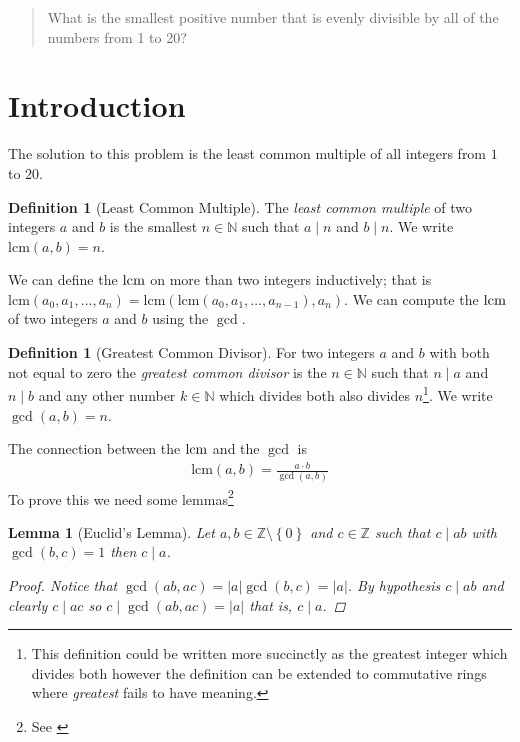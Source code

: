 \documentclass[oneside,12pt]{book}   	%
\newcounter{ex}
\newcounter{def}
\newcounter{pr}
\newtheorem{lem}[thm]{Lemma}
\theoremstyle{definition}
\newtheorem{definition}[thm]{Definition}
\newcommand{\lcm}[1]{\mathrm{lcm }#1}
\newcommand{\set}[1]{\left\{#1\right\}}
\newcommand{\order}[1]{\left| #1 \right|}
\begin{document}
\begin{spacing}{1.618}
\begin{quote}
			What is the smallest positive number that is evenly divisible by all of the numbers from 1 to 20?
		\end{quote}
	
		\section{Introduction}
		
			The solution to this problem is the least common multiple of all integers from $1$ to $20$. 
			\begin{definition}[Least Common Multiple]
				The \emph{least common multiple} of two integers $a$ and $b$ is the smallest $n\in\mathbb{N}$ such that $a\mid n$ and $b\mid n$. We write $\lcm{(a, b)}=n$. 
			\end{definition}
			We can define the $\lcm$ on more than two integers inductively; that is $\lcm{\left(a_0, a_1, \dots, a_n\right)} = \lcm{\left(\lcm{\left(a_0, a_1, \dots, a_{n-1}\right)}, a_n\right)}$. We can compute the $\lcm$ of two integers $a$ and $b$ using the $\gcd$. 
			\begin{definition}[Greatest Common Divisor]
				For two integers $a$ and $b$ with both not equal to zero the \emph{greatest common divisor} is the $n\in\mathbb{N}$ such that $n\mid a$ and $n\mid b$ and any other number $k\in\mathbb{N}$ which divides both also divides $n$\footnote{This definition could be written more succinctly as the greatest integer which divides both however the definition can be extended to commutative rings where \emph{greatest} fails to have meaning.}. We write $\gcd{(a, b)}=n$. 
			\end{definition}
			
			The connection between the $\lcm$ and the $\gcd$ is
			\begin{alignat}{4}
				\lcm{(a, b)}=\frac{a\cdot b}{\gcd{(a, b)}}\label{E:5:1}
			\end{alignat}
			To prove this we need some lemmas\footnote{See \cite{Mollin2008}}
			\begin{lem}[Euclid's Lemma]\label{Lem:5:1}
				Let $a,b\in\mathbb{Z}\setminus\set{0}$ and $c\in\mathbb{Z}$ such that $c\mid ab$ with $\gcd{(b,c)}=1$ then $c\mid a$. 
				\begin{proof}
					Notice that $\gcd{(ab, ac)}=\order{a}\gcd{(b,c)}=\order{a}$. By hypothesis $c\mid ab$ and clearly $c\mid ac$ so $c\mid\gcd{(ab, ac)}=\order{a}$ that is, $c\mid a$. 
				\end{proof}
			\end{lem}
			

\end{spacing}
\end{document}
